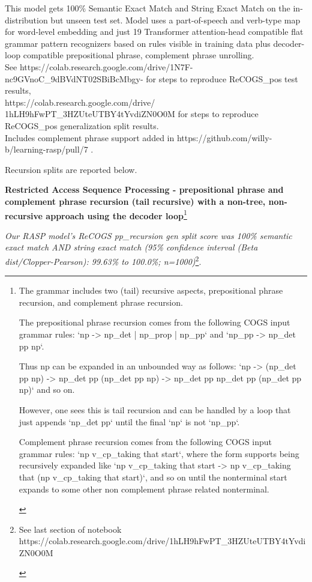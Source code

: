 \documentclass[11pt]{article}
\begin{document}
\begin{table}
{\begin{small}
This model gets 100\% Semantic Exact Match and String Exact Match on the in-distribution but unseen test set.
 Model uses a part-of-speech and verb-type map for word-level embedding and just 19 Transformer attention-head compatible flat grammar pattern recognizers based on rules visible in training data plus decoder-loop compatible prepositional phrase, complement phrase unrolling. \\
See https://colab.research.google.com/drive/1N7F-nc9GVnoC\_9dBVdNT02SBiBcMbgy- for steps to reproduce ReCOGS\_pos test results,\\
https://colab.research.google.com/drive/
1hLH9hFwPT\_3HZUteUTBY4tYvdiZN0O0M for steps to reproduce ReCOGS\_pos generalization split results. \\
Includes complement phrase support added in https://github.com/willy-b/learning-rasp/pull/7 .\end{small}}
\end{table}


Recursion splits are reported below.

\textbf{Restricted Access Sequence Processing - prepositional phrase and complement phrase recursion (tail recursive) with a non-tree, non-recursive approach using the decoder loop}\footnote{
\begin{tiny}
The grammar includes two (tail) recursive aspects, prepositional phrase recursion, and complement phrase recursion.

The prepositional phrase recursion comes from the following COGS input grammar rules: `np -> np\_det | np\_prop | np\_pp` and `np\_pp -> np\_det pp np`.

Thus np can be expanded in an unbounded way as follows: `np -> (np\_det pp np) -> np\_det pp (np\_det pp np) -> np\_det pp np\_det pp (np\_det pp np)` and so on.

However, one sees this is tail recursion and can be handled by a loop that just appends `np\_det pp` until the final `np` is not `np\_pp`.

Complement phrase recursion comes from the following COGS input grammar rules: `np v\_cp\_taking that start`, where the form supports being recursively expanded like `np v\_cp\_taking that start -> np v\_cp\_taking that (np v\_cp\_taking that start)`, and so on until the nonterminal start expands to some other non complement phrase related nonterminal.
\end{tiny}
}

\textit{Our RASP model's ReCOGS pp\_recursion gen split score was 100\% semantic exact match AND string exact match (95\% confidence interval (Beta dist/Clopper-Pearson): 99.63\% to 100.0\%; n=1000)}\footnote{
\begin{tiny}
See last section of notebook https://colab.research.google.com/drive/1hLH9hFwPT\_3HZUteUTBY4tYvdiZN0O0M
\end{tiny}
}.
\end{document}
